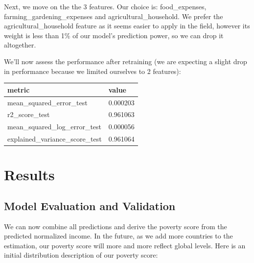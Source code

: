 \documentclass{article}
\begin{document}
Next, we move on the the 3 features. Our choice is: food\_expenses, farming\_gardening\_expenses and agricultural\_household. We prefer the agricultural\_household feature as it seems easier to apply in the field, however its weight is less than 1\% of our model's prediction power, so we can drop it altogether.

We'll now assess the performance after retraining (we are expecting a slight drop in performance because we limited ourselves to 2 features):

\begin{center}
\begin{tabular}{ |l|l| }
  \hline
  metric & value\\
  \hline
  mean\_squared\_error\_test & 0.000203\\
  r2\_score\_test & 0.961063\\
  mean\_squared\_log\_error\_test & 0.000056\\
  explained\_variance\_score\_test & 0.961064\\
  \hline
\end{tabular}
\end{center}

\section{Results}
\subsection{Model Evaluation and Validation}
We can now combine all predictions and derive the poverty score from the predicted normalized income. In the future, as we add more countries to the estimation, our poverty score will more and more reflect global levels. Here is an initial distribution description of our poverty score:
\end{document}
